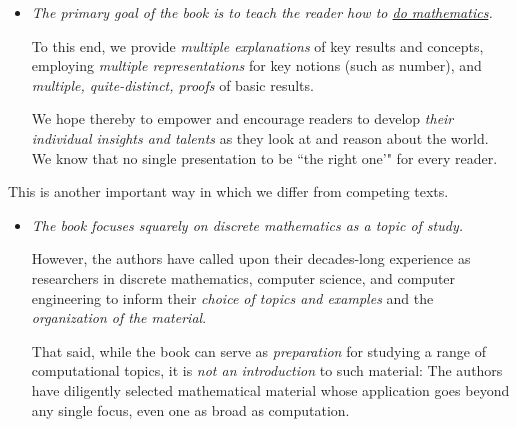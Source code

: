 \documentclass{article}[12pt]
\begin{document}
\medskip

\begin{itemize}
\item
{\em The primary goal of the book is to teach the reader how to \underline{do mathematics}.}

\smallskip

To this end, we provide {\em multiple explanations} of key results and concepts, employing {\em multiple representations} for key notions (such as number), and {\em multiple, quite-distinct, proofs} of basic results.

\smallskip

We hope thereby to empower and encourage readers to develop {\em their individual insights and talents} as they look at and reason about the world.  We know that no single presentation to be ``the right one'" for every reader.
\end{itemize}
{\sf This is another important way in which we differ from competing texts.}

\medskip

\begin{itemize}
\item
{\em The book focuses squarely on discrete mathematics as a topic of study.}

\smallskip

However, the authors have called upon their decades-long experience as researchers in discrete mathematics, computer science, and computer engineering to inform their {\em choice of topics and examples} and the {\em organization of the material}.

\smallskip

That said, while the book can serve as {\em preparation} for studying a range of computational topics, it is {\em not an introduction} to such material: The authors have diligently selected mathematical material whose application goes beyond any single focus, even one as broad as computation.
\end{itemize}

\bigskip
\end{document}
